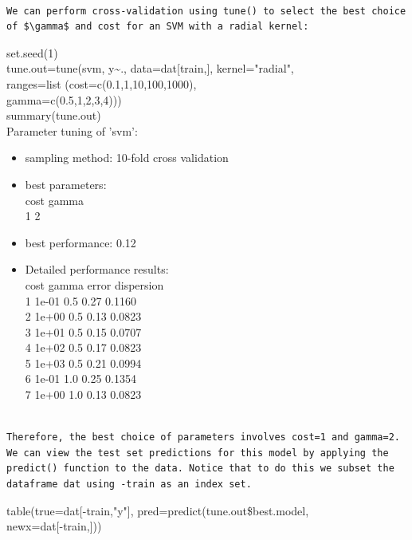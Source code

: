 \documentclass[10pt]{article}
\begin{document}
\begin{verbatim}

We can perform cross-validation using tune() to select the best choice of $\gamma$ and cost for an SVM with a radial kernel:
\end{verbatim}

\begin{displayquote}
set.seed(1)\\[0pt]
tune.out=tune(svm, y\~{}., data=dat[train,], kernel="radial",\\
ranges=list (cost=c(0.1,1,10,100,1000),\\
gamma=c(0.5,1,2,3,4)))\\
summary(tune.out)\\
Parameter tuning of 'svm':
\end{displayquote}

\begin{itemize}
  \item sampling method: 10-fold cross validation
  \item best parameters:\\
cost gamma\\
1 2
  \item best performance: 0.12
  \item Detailed performance results:\\
cost gamma error dispersion\\
1 1e-01 0.5 0.27 0.1160\\
2 1e+00 0.5 0.13 0.0823\\
3 1e+01 0.5 0.15 0.0707\\
4 1e+02 0.5 0.17 0.0823\\
5 1e+03 0.5 0.21 0.0994\\
6 1e-01 1.0 0.25 0.1354\\
7 1e+00 1.0 0.13 0.0823
\end{itemize}

\begin{verbatim}

Therefore, the best choice of parameters involves cost=1 and gamma=2. We can view the test set predictions for this model by applying the predict() function to the data. Notice that to do this we subset the dataframe dat using -train as an index set.
\end{verbatim}

\begin{displayquote}
table(true=dat[-train,"y"], pred=predict(tune.out\$best.model,\\[0pt]
newx=dat[-train,]))
\end{displayquote}
\end{document}
